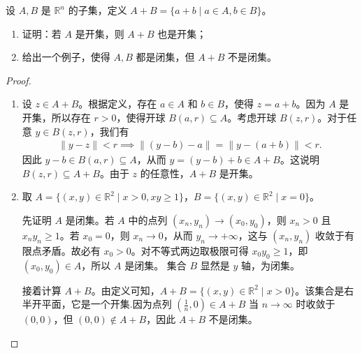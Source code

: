 \documentclass[../../main.tex]{subfiles}%
\begin{document}
\begin{example}
设 \(A, B\) 是 \(\mathbb{R}^n\) 的子集，定义 \(A+B = \{a+b \mid a \in A, b \in B\}\)。
\begin{enumerate}[(1)]
\item 证明：若 \(A\) 是开集，则 \(A+B\) 也是开集；
\item 给出一个例子，使得 \(A, B\) 都是闭集，但 \(A+B\) 不是闭集。
\end{enumerate}
\end{example}
\begin{proof}
\begin{enumerate}[(1)]
\item 设 \(z \in A+B\)。根据定义，存在 \(a \in A\) 和 \(b \in B\)，使得 \(z = a+b\)。因为 \(A\) 是开集，所以存在 \(r>0\)，使得开球 \(B(a, r) \subseteq A\)。考虑开球 \(B(z, r)\)。对于任意 \(y \in B(z, r)\)，我们有
\begin{align*}
\|y - z\| < r \implies \|(y - b) - a\| = \|y - (a+b)\| < r.
\end{align*}
因此 \(y - b \in B(a, r) \subseteq A\)，从而 \(y = (y-b) + b \in A+B\)。这说明 \(B(z, r) \subseteq A+B\)。由于 \(z\) 的任意性，\(A+B\) 是开集。

\item 取 \(A = \{(x, y) \in \mathbb{R}^2 \mid x>0, xy \geqslant 1\}\)，\(B = \{(x, y) \in \mathbb{R}^2 \mid x=0\}\)。

先证明 \(A\) 是闭集。若 \(A\) 中的点列 \((x_n, y_n) \to (x_0, y_0)\)，则 \(x_n>0\) 且 \(x_n y_n \geqslant 1\)。若 \(x_0=0\)，则 \(x_n \to 0\)，从而 \(y_n \to +\infty\)，这与 \((x_n, y_n)\) 收敛于有限点矛盾。故必有 \(x_0 > 0\)。对不等式两边取极限可得 \(x_0 y_0 \geqslant 1\)，即 \((x_0, y_0) \in A\)，所以 \(A\) 是闭集。
集合 \(B\) 显然是 \(y\) 轴，为闭集。

接着计算 \(A+B\)。由定义可知，\(A+B = \{(x, y) \in \mathbb{R}^2 \mid x>0\}\)。该集合是右半开平面，它是一个开集.因为点列 \((\frac{1}{n}, 0) \in A+B\) 当 \(n \to \infty\) 时收敛于 \((0,0)\)，但 \((0,0) \notin A+B\)，因此 \(A+B\) 不是闭集。
\end{enumerate}
\end{proof}
\end{document}
